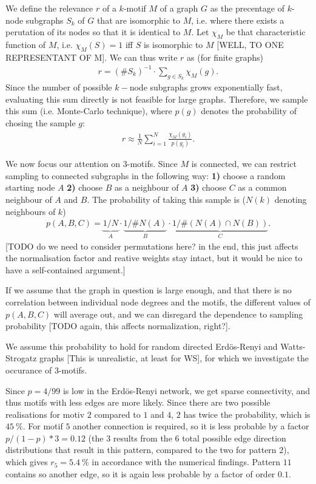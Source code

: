 \documentclass{scrartcl}
\begin{document}
We define the relevance $r$ of a $k$-motif $M$ of a graph $G$ as the precentage of $k$-node subgraphs $S_k$ of $G$ that are isomorphic to $M$, i.e. where there exists a perutation of its nodes so that it is identical to $M$. Let $\chi_M$ be that characteristic function of $M$, i.e. $\chi_M(S) = 1$ iff $S$ is isomorphic to $M$ [WELL, TO ONE REPRESENTANT OF M]. We can thus write $r$ as (for finite graphs)
\begin{align}
 r = (\# S_k)^{-1} \cdot \sum_{g \in S_k} \chi_M (g).
\end{align}
Since the number of possible $k-$node subgraphs grows exponentially fast, evaluating this sum directly is not feasible for large graphs. Therefore, we sample this sum (i.e. Monte-Carlo technique), where $p(g)$ denotes the probability of chosing the sample $g$:
\begin{align}
 r \approx \frac{1}{N} \sum_{i=1}^{N} \frac{\chi_M (g_i)}{p(g_i)}.
\end{align}

We now focus our attention on $3$-motifs. Since $M$ is connected, we can restrict sampling to connected subgraphs in the following way: \textbf{1)} choose a random starting node $A$ \textbf{2)} choose $B$ as a neighbour of $A$ \textbf{3)} choose $C$ as a common neighbour of $A$ and $B$. The probability of taking this sample is ($N(k)$ denoting neighbours of $k$)
\begin{align}
 p(A,B,C) = \underbrace{1/N}_{A} \cdot \underbrace{1/\#N(A)}_{B} \cdot \underbrace{1/\#(N(A) \cap N(B))}_{C}.
\end{align}
[TODO do we need to consider permutations here? in the end, this just affects the normalisation factor and reative weights stay intact, but it would be nice to have a self-contained argument.]

If we assume that the graph in question is large enough, and that there is no correlation between individual node degrees and the motifs, the different values of $p(A,B,C)$ will average out, and we can disregard the dependence to sampling probability [TODO again, this affects normalization, right?]. 

We assume this probability to hold for random directed Erdös-Renyi and Watts-Strogatz graphs [This is unrealistic, at least for WS], for which we investigate the occurance of 3-motifs.

Since $p=4/99$ is low in the Erdös-Renyi network, we get sparse connectivity, and thus motifs with less edges are more likely. Since there are two possible realisations for motiv $2$ compared to $1$ and $4$, $2$ has twice the probability, which is $\SI{45}{\percent}$. For motif $5$ another connection is required, so it is less probable by a factor $p/(1-p)*3 = 0.12$ (the $3$ results from the $6$ total possible edge direction distributions that result in this pattern, compared to the two for pattern $2$), which gives $r_5=\SI{5.4}{\percent}$ in accordance with the numerical findings. Pattern $11$ contains so another edge, so it is again less probable by a factor of order $0.1$.
\end{document}
